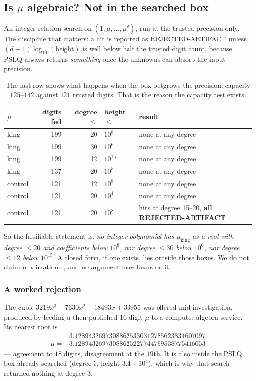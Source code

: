\documentclass[11pt]{article}
\begin{document}
\subsection{Is $\mu$ algebraic? Not in the searched box}

An integer-relation search on $(1,\mu,\dots,\mu^d)$, run at the trusted
precision only. The discipline that matters: a hit is reported as
REJECTED-ARTIFACT unless $(d{+}1)\log_{10}(\text{height})$ is well below half
the trusted digit count, because PSLQ always returns \emph{something} once the
unknowns can absorb the input precision.

\begin{table}[H]
\centering\small
\begin{tabular}{l r r l l}
\toprule
$\mu$ & digits fed & degree $\le$ & height $\le$ & result \\
\midrule
king & 199 & 20 & $10^{8}$ & none at any degree \\
king & 199 & 30 & $10^{6}$ & none at any degree \\
king & 199 & 12 & $10^{15}$ & none at any degree \\
king & 137 & 20 & $10^{5}$ & none at any degree \\
control & 121 & 12 & $10^{8}$ & none at any degree \\
control & 121 & 20 & $10^{4}$ & none at any degree \\
control & 121 & 20 & $10^{8}$ & hits at degree 15--20, \textbf{all REJECTED-ARTIFACT} \\
\bottomrule
\end{tabular}
\caption{The last row shows what happens when the box outgrows the precision:
capacity $125$--$142$ against $121$ trusted digits. That is the reason the
capacity test exists.}
\label{tab:pslq}
\end{table}

So the falsifiable statement is: \emph{no integer polynomial has $\mu_{\text{king}}$
as a root with degree $\le 20$ and coefficients below $10^8$, nor degree $\le 30$
below $10^6$, nor degree $\le 12$ below $10^{15}$}. A closed form, if one exists,
lies outside those boxes. We do not claim $\mu$ is irrational, and no argument
here bears on it.

\subsubsection*{A worked rejection}

The cubic $3219x^3 - 7630x^2 - 18493x + 33955$ was offered mid-investigation,
produced by feeding a then-published $16$-digit $\mu$ to a computer algebra
service. Its nearest root is
\[
  \begin{aligned}
    &3.12894326973088625330312785623831607097 \\
    \mu = {}&3.12894326973088625227744799538775416053
  \end{aligned}
\]
--- agreement to $18$ digits, disagreement at the $19$th. It is also inside the
PSLQ box already searched (degree $3$, height $3.4\times10^4$), which is why that
search returned nothing at degree $3$.
\end{document}
